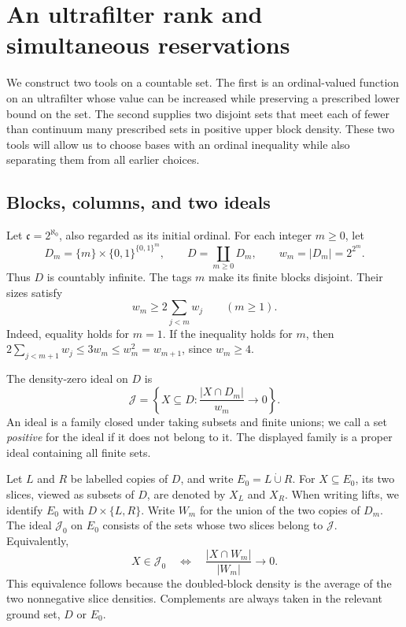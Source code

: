 \section{An ultrafilter rank and simultaneous reservations}
\label{sec:filters}

We construct two tools on a countable set. The first is an ordinal-valued
function on an ultrafilter whose value can be increased while preserving
a prescribed lower bound on the set. The second supplies two disjoint
sets that meet each of fewer than continuum many prescribed sets in
positive upper block density. These two tools will allow us to choose bases
with an ordinal inequality while also separating them from all earlier
choices.

\subsection{Blocks, columns, and two ideals}

Let $\mathfrak c=2^{\aleph_0}$, also regarded as its initial ordinal.
For each integer $m\ge0$, let
\[
 D_m=\{m\}\times\{0,1\}^{\{0,1\}^m},\qquad
 D=\coprod_{m\ge0}D_m,\qquad w_m=|D_m|=2^{2^m}.
\]
Thus $D$ is countably infinite. The tags $m$ make its finite blocks
disjoint. Their sizes satisfy
\begin{equation}\label{eq:block-growth}
 w_m\ge2\sum_{j<m}w_j\qquad(m\ge1).
\end{equation}
Indeed, equality holds for $m=1$. If the inequality holds for $m$, then
$2\sum_{j<m+1}w_j\le3w_m\le w_m^2=w_{m+1}$, since $w_m\ge4$.

The density-zero ideal on $D$ is
\[
 \mathcal J=\left\{X\subseteq D:
       \frac{|X\cap D_m|}{w_m}\longrightarrow0\right\}.
\]
An ideal is a family closed under taking subsets and finite unions;
we call a set \emph{positive} for the ideal if it does not belong to it.
The displayed family is a proper ideal containing all finite sets.

Let $L$ and $R$ be labelled copies of $D$, and write
$E_0=L\mathbin{\dot\cup}R$. For $X\subseteq E_0$, its two slices,
viewed as subsets of $D$, are denoted by $X_L$ and $X_R$.
When writing lifts, we identify $E_0$ with $D\times\{L,R\}$.
Write $W_m$ for the union of the two copies of $D_m$.
The ideal $\mathcal J_0$ on $E_0$ consists of the sets whose two slices
belong to $\mathcal J$. Equivalently,
\[
 X\in\mathcal J_0
 \quad\Longleftrightarrow\quad
 \frac{|X\cap W_m|}{|W_m|}\longrightarrow0.
\]
This equivalence follows because the doubled-block density is the
average of the two nonnegative slice densities. Complements are always
taken in the relevant ground set, $D$ or $E_0$.

